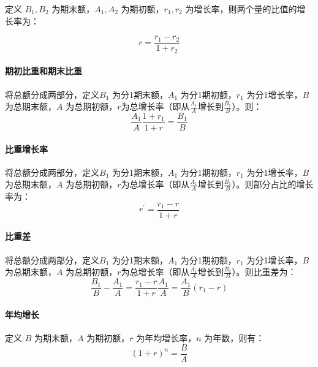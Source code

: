 定义 $B_1,B_2$ 为期末额，$A_1,A_2$ 为期初额，$r_1,r_2$ 为增长率，则两个量的比值的增长率为：

\[
	r = \frac{r_1-r_2}{1+r_2}
\]

\paragraph{期初比重和期末比重}

将总额分成两部分，定义$B_1$ 为分1期末额，$A_1$ 为分1期初额，$r_1$ 为分1增长率，$B$ 为总期末额，$A$ 为总期初额，$r$为总增长率（即从$\frac{A_1}{A}$增长到$\frac{B_1}{B}$）。则：
\[
	\frac{A_1}{A} \frac{1+r_1}{1+r} = \frac{B_1}{B}
\]

\paragraph{比重增长率}

将总额分成两部分，定义$B_1$ 为分1期末额，$A_1$ 为分1期初额，$r_1$ 为分1增长率，$B$ 为总期末额，$A$ 为总期初额，$r$为总增长率（即从$\frac{A_1}{A}$增长到$\frac{B_1}{B}$）。则部分占比的增长率为：
\[
	r^\prime = \frac{r_1-r}{1+r}
\]

\paragraph{比重差}
将总额分成两部分，定义$B_1$ 为分1期末额，$A_1$ 为分1期初额，$r_1$ 为分1增长率，$B$ 为总期末额，$A$ 为总期初额，$r$为总增长率（即从$\frac{A_1}{A}$增长到$\frac{B_1}{B}$）。则比重差为：
\[
	\frac{B_1}{B} - \frac{A_1}{A} = \frac{r_1 - r}{1+r}\frac{A_1}{A} = \frac{A_1}{B} (r_1-r)
\]

\paragraph{年均增长}

定义 $B$ 为期末额，$A$ 为期初额，$r$ 为年均增长率，$n$ 为年数，则有：
\[
	(1+r)^n = \frac{B}{A}
\]